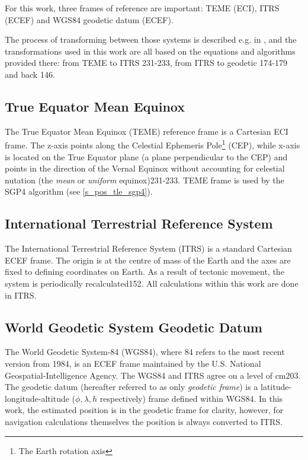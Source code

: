 For this work, three frames of reference are important: TEME (ECI), ITRS (ECEF) and WGS84 geodetic datum (ECEF).

The process of transforming between those systems is described e.g. in \cite{pos01}, and the transformations used in this work are all based on the equations and algorithms provided there: from TEME to ITRS \citep{pos01}{231-233}, from ITRS to geodetic \citep{pos01}{174-179} and back \citep{pos01}{146}.

\subsection{True Equator Mean Equinox}
The True Equator Mean Equinox (TEME) reference frame is a Cartesian ECI frame. The z-axis points along the Celestial Ephemeris Pole\footnote{The Earth rotation axis} (CEP), while x-axis is located on the True Equator plane (a plane perpendicular to the CEP) and points in the direction of the Vernal Equinox without accounting for celestial nutation (the \textit{mean} or \textit{uniform} equinox)\citep{pos01}{231-233}. TEME frame is used by the SGP4 algorithm (see \autoref{s_pos_tle_sgp4}).

\subsection{International Terrestrial Reference System}
The International Terrestrial Reference System (ITRS) is a standard Cartesian ECEF frame. The origin is at the centre of mass of the Earth and the axes are fixed to defining coordinates on Earth. As a result of tectonic movement, the system is periodically recalculated\citep{pos01}{152}. All calculations within this work are done in ITRS.

\subsection{World Geodetic System Geodetic Datum}
The World Geodetic System-84 (WGS84), where 84 refers to the most recent version from 1984, is an ECEF frame maintained by the U.S. National Geospatial-Intelligence Agency. The WGS84 and ITRS agree on a level of \unit{cm}\citep{pos01}{203}. The geodetic datum  (hereafter referred to as only \textit{geodetic frame}) is a latitude-longitude-altitude ($\phi, \lambda, h$ respectively) frame defined within WGS84. In this work, the estimated position is in the geodetic frame for clarity, however, for navigation calculations themselves the position is always converted to ITRS.
